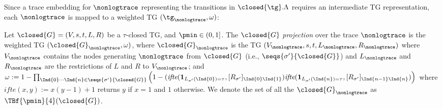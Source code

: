 %
Since a trace embedding for $\nonlogtrace$ representing the transitions in $\closed{\tg}.\Lambda$ requires an intermediate 
TG representation, each $\nonlogtrace$ is mapped to a weighted TG $(\tg_\nonlogtrace,\omega)$:
%
\begin{definition}
	Let $\closed{G}=(V,s,t,L,R)$ be a $\tau$-closed TG, and $\pmin\in(0,1]$. The $\closed{G}$ \emph{projection} over the trace 
	$\nonlogtrace$ is the weighted TG $(\closed{G}_\nonlogtrace,\omega)$, where $\closed{G}_\nonlogtrace$ is the TG 
	$(V_\nonlogtrace,s,t,L_\nonlogtrace,R_\nonlogtrace)$ where
	$V_\nonlogtrace$ contains the nodes generating $\nonlogtrace$ from $\closed{G}$	
	(i.e., $\seqs{\sigma'}{ \closed{G}}$) and
	$L_\nonlogtrace$ and $R_\nonlogtrace$ are the restrictions of $L$ and $R$ to $V_\nonlogtrace$; and
	$\omega := 1-\prod_{\Ind{0}\cdots\Ind{n}\in\seqs{\sigma'}{ \closed{G}}}\Big(1-(\textit{ifte}(\mathbf{1}_{L_{\sigma'}(\Ind{0})=\tau},[R_{\sigma'}]_{\Ind{0}\Ind{1}})\textit{ifte}(\mathbf{1}_{L_{\sigma'}(\Ind{n})=\tau},[R_{\sigma'}]_{\Ind{n-1}\Ind{n}})\Big)$
	where $\textit{ifte}(x,y):=x(y-1)+1$ returns $y$ if $x=1$ and $1$ otherwise. We denote the set of all the $\closed{G}_\nonlogtrace$ as $\TBf{\pmin}{4}(\closed{G})$.%
\end{definition}
%	
